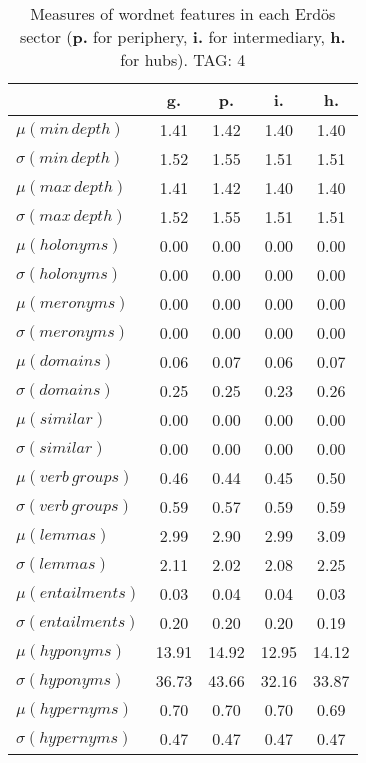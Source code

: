 \begin{table}[h!]
\begin{center}
\begin{tabular}{| l || c | c | c | c |}\hline
 & {\bf g.} & {\bf p.} & {\bf i.} & {\bf h.} \\\hline\hline
$\mu(min\,depth)$ & 1.41  & 1.42  & 1.40  & 1.40 \\
$\sigma(min\,depth)$ & 1.52  & 1.55  & 1.51  & 1.51 \\\hline
$\mu(max\,depth)$ & 1.41  & 1.42  & 1.40  & 1.40 \\
$\sigma(max\,depth)$ & 1.52  & 1.55  & 1.51  & 1.51 \\\hline
$\mu(holonyms)$ & 0.00  & 0.00  & 0.00  & 0.00 \\
$\sigma(holonyms)$ & 0.00  & 0.00  & 0.00  & 0.00 \\\hline
$\mu(meronyms)$ & 0.00  & 0.00  & 0.00  & 0.00 \\
$\sigma(meronyms)$ & 0.00  & 0.00  & 0.00  & 0.00 \\\hline
$\mu(domains)$ & 0.06  & 0.07  & 0.06  & 0.07 \\
$\sigma(domains)$ & 0.25  & 0.25  & 0.23  & 0.26 \\\hline
$\mu(similar)$ & 0.00  & 0.00  & 0.00  & 0.00 \\
$\sigma(similar)$ & 0.00  & 0.00  & 0.00  & 0.00 \\\hline
$\mu(verb\,groups)$ & 0.46  & 0.44  & 0.45  & 0.50 \\
$\sigma(verb\,groups)$ & 0.59  & 0.57  & 0.59  & 0.59 \\\hline
$\mu(lemmas)$ & 2.99  & 2.90  & 2.99  & 3.09 \\
$\sigma(lemmas)$ & 2.11  & 2.02  & 2.08  & 2.25 \\\hline
$\mu(entailments)$ & 0.03  & 0.04  & 0.04  & 0.03 \\
$\sigma(entailments)$ & 0.20  & 0.20  & 0.20  & 0.19 \\\hline
$\mu(hyponyms)$ & 13.91  & 14.92  & 12.95  & 14.12 \\
$\sigma(hyponyms)$ & 36.73  & 43.66  & 32.16  & 33.87 \\\hline
$\mu(hypernyms)$ & 0.70  & 0.70  & 0.70  & 0.69 \\
$\sigma(hypernyms)$ & 0.47  & 0.47  & 0.47  & 0.47 \\\hline
\end{tabular}
\caption{Measures of wordnet features in each Erd\"os sector ({{\bf p.}} for periphery, {{\bf i.}} for intermediary, {{\bf h.}} for hubs). TAG: 4}
\end{center}
\end{table}